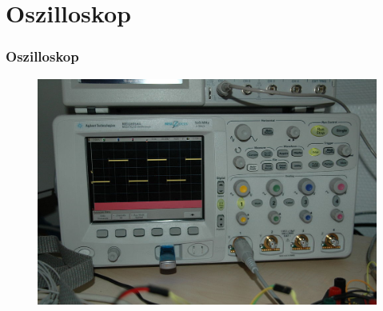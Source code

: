 
\section*{Oszilloskop}

\begin{frame}
  \frametitle{Oszilloskop}
  \begin{center}
    \begin{figure}
      \includegraphics[width=1\textwidth,height=.75\textheight,keepaspectratio]{e17/osziModern.jpg}
    \end{figure}
  \end{center}
\end{frame}

